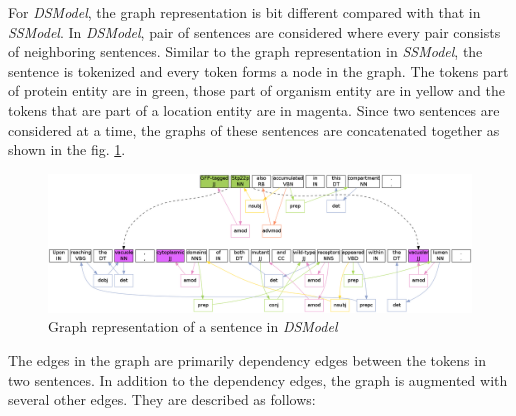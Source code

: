 
For \textit{DSModel}, the graph representation is bit different compared with that in \textit{SSModel}. In \textit{DSModel}, pair of sentences are considered where every pair consists of neighboring sentences. Similar to the graph representation in \textit{SSModel}, the sentence is tokenized and every token forms a node in the graph. The tokens part of protein entity are in green, those part of organism entity are in yellow and the tokens that are part of a location entity are in magenta. Since two sentences are considered at a time, the graphs of these sentences are concatenated together as shown in the fig. \ref{fig:DSGraph}. 

\begin{figure}
\centering
\includegraphics[scale=0.25]{figures/DiffSentenceGraph.png}
\caption{Graph representation of a sentence in \textit{DSModel}}\label{fig:DSGraph}
\end{figure}


The edges in the graph are primarily dependency edges between the tokens in two sentences. In addition to the dependency edges, the graph is augmented with several other edges. They are described as follows:

